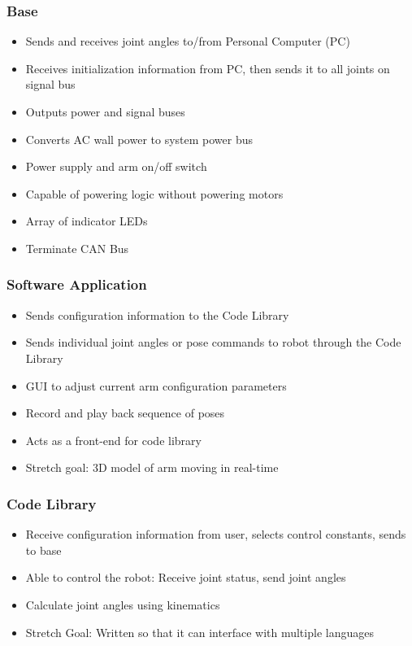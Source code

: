 \subsubsection{Base}
\begin{itemize}
	\item Sends and receives joint angles to/from Personal Computer (PC)
	\item Receives initialization information from PC, then sends it to all joints on signal bus
	\item Outputs power and signal buses
	\item Converts AC wall power to system power bus
	\item Power supply and arm on/off switch
	\item Capable of powering logic without powering motors
	\item Array of indicator LEDs
	\item Terminate CAN Bus
\end{itemize}

\subsubsection{Software Application}
\begin{itemize}
	\item Sends configuration information to the Code Library
	\item Sends individual joint angles or pose commands to robot through the Code Library
	\item GUI to adjust current arm configuration parameters
	\item Record and play back sequence of poses
	\item Acts as a front-end for code library
	\item Stretch goal: 3D model of arm moving in real-time
\end{itemize}

\subsubsection{Code Library}
\begin{itemize}
	\item Receive configuration information from user, selects control constants, sends to base
	\item Able to control the robot: Receive joint status, send joint angles
	\item Calculate joint angles using kinematics
	\item Stretch Goal: Written so that it can interface with multiple languages
\end{itemize}

